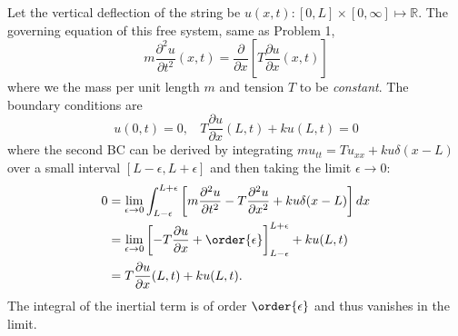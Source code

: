 Let the vertical deflection of the string be $u(x, t): [0,L]\times[0, \infty] \mapsto \mathbb{R}$. 
The governing equation of this free system, same as Problem 1, 
\begin{equation}
    m \frac{\partial^2 u}{\partial t^2}(x, t) = \frac{\partial }{\partial x} \left[T \frac{\partial u}{\partial x}(x, t)\right]
\end{equation}
where we the mass per unit length $m$ and tension $T$ to be \emph{constant}. 
The boundary conditions are 
\begin{equation}\label{eqn:hw2_p3_bc}
    u(0,t) = 0, ~~~~ T \frac{\partial u}{\partial x}(L, t) + k u(L, t) = 0
\end{equation}
where the second BC can be derived by integrating $mu_{tt} = Tu_{xx} + ku\delta(x-L)$ over a small interval $[L-\epsilon, L+\epsilon]$ and then taking the limit $\epsilon \rightarrow 0$: 
\begin{equation}
\begin{aligned}
    0 &= \lim_{\epsilon \rightarrow 0} \int_{L-\epsilon}^{L+\epsilon} \left[m \frac{\partial^2 u}{\partial t^2} - T \frac{\partial^2 u}{\partial x^2} + ku\delta(x-L)\right] dx \\
    &= \lim_{\epsilon\rightarrow 0} {\left[ -T \frac{\partial u}{\partial x} + \order{\epsilon} \right]}_{L-\epsilon}^{L+\epsilon} + ku(L, t) \\
    &= T \frac{\partial u}{\partial x}(L, t) + k u(L, t).
\end{aligned}
\end{equation}
The integral of the inertial term is of order $\order{\epsilon}$ and thus vanishes in the limit. 


